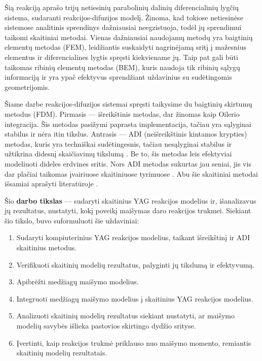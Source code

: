 Šią reakciją aprašo trijų netiesinių parabolinių dalinių diferencialinių lygčių sistema, sudaranti reakcijos-difuzijos modelį. Žinoma, kad tokiose netiesinėse sistemose analitinis sprendinys dažniausiai neegzistuoja, todėl jų sprendimui taikomi skaitiniai metodai. Vienas dažniausiai naudojamų metodų yra baigtinių elementų metodas (FEM), leidžiantis suskaidyti nagrinėjamą sritį į mažesnius elementus ir diferencialines lygtis spręsti kiekviename jų. Taip pat gali būti taikomas ribinių elementų metodas (BEM), kuris naudoja tik ribinių sąlygų informaciją ir yra ypač efektyvus sprendžiant uždavinius su sudėtingomis geometrijomis.

Šiame darbe reakcijos-difuzijos sistemai spręsti taikysime du baigtinių skirtumų metodus (FDM). Pirmasis — išreikštinis metodas, dar žinomas kaip Oilerio integracija. Šis metodas pasižymi paprasta implementacija, tačiau yra sąlyginai stabilus ir nėra itin tikslus. Antrasis — ADI (neišreikštinis kintamos krypties) metodas, kuris yra techniškai sudėtingesnis, tačiau nesąlyginai stabilus ir užtikrina didesnį skaičiavimų tikslumą \cite{doi:10.1137/0103003}. Be to, šis metodas leis efektyviai modeliuoti dideles erdvines sritis. Nors ADI metodas sukurtas jau seniai, jis vis dar plačiai taikomas įvairiuose skaitiniuose tyrimuose \cite{gaidamauskaiteComparisonFiniteDifference2007}. Abu šie skaitiniai metodai išsamiai aprašyti literatūroje \cite{pressNumericalRecipes3rd2007,levequeFiniteDifferenceMethods2007}.

Šio \textbf{darbo tikslas} — sudaryti skaitinius YAG reakcijos modelius ir, išanalizavus jų rezultatus, nustatyti, kokį poveikį maišymas daro reakcijos trukmei. Siekiant šio tikslo, buvo suformuluoti šie uždaviniai:

\begin{enumerate}
  \item Sudaryti kompiuterinius YAG reakcijos modelius, taikant išreikštinį ir ADI skaitinius metodus.
  \item Verifikuoti skaitinių modelių rezultatus, palyginti jų tikslumą ir efektyvumą.
  \item Apibrėžti medžiagų maišymo modelius.
  \item Integruoti medžiagų maišymo modelius į skaitinius YAG reakcijos modelius.
  \item Analizuoti skaitinių modelių rezultatus siekiant nustatyti, ar maišymo modelių savybės išlieka pastovios skirtingo dydžio srityse.
  \item Įvertinti, kaip reakcijos trukmė priklauso nuo maišymo momento, remiantis skaitinių modelių rezultatais.
\end{enumerate}
